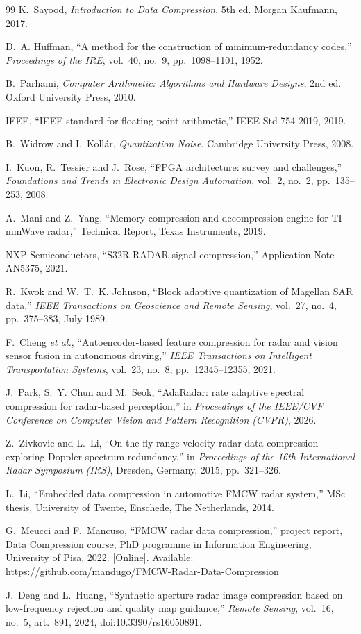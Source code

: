 \begin{thebibliography}{99}
K.~Sayood, \emph{Introduction to Data Compression}, 5th ed. Morgan Kaufmann,
2017.

D.~A. Huffman, ``A method for the construction of minimum-redundancy codes,''
\emph{Proceedings of the IRE}, vol.~40, no.~9, pp.~1098--1101, 1952.

B.~Parhami, \emph{Computer Arithmetic: Algorithms and Hardware Designs}, 2nd
ed. Oxford University Press, 2010.

IEEE, ``IEEE standard for floating-point arithmetic,'' IEEE Std 754-2019, 2019.

B.~Widrow and I.~Koll\'ar, \emph{Quantization Noise}. Cambridge University
Press, 2008.

I.~Kuon, R.~Tessier and J.~Rose, ``FPGA architecture: survey and challenges,''
\emph{Foundations and Trends in Electronic Design Automation}, vol.~2, no.~2,
pp.~135--253, 2008.

A.~Mani and Z.~Yang, ``Memory compression and decompression engine for TI
mmWave radar,'' Technical Report, Texas Instruments, 2019.

NXP Semiconductors, ``S32R RADAR signal compression,'' Application Note AN5375,
2021.

R.~Kwok and W.~T.~K. Johnson, ``Block adaptive quantization of Magellan SAR
data,'' \emph{IEEE Transactions on Geoscience and Remote Sensing}, vol.~27,
no.~4, pp.~375--383, July 1989.

F.~Cheng \emph{et al.}, ``Autoencoder-based feature compression for radar and
vision sensor fusion in autonomous driving,'' \emph{IEEE Transactions on
Intelligent Transportation Systems}, vol.~23, no.~8, pp.~12345--12355, 2021.

J.~Park, S.~Y. Chun and M.~Seok, ``AdaRadar: rate adaptive spectral compression
for radar-based perception,'' in \emph{Proceedings of the IEEE/CVF Conference on
Computer Vision and Pattern Recognition (CVPR)}, 2026.

Z.~Zivkovic and L.~Li, ``On-the-fly range-velocity radar data compression
exploring Doppler spectrum redundancy,'' in \emph{Proceedings of the 16th
International Radar Symposium (IRS)}, Dresden, Germany, 2015, pp.~321--326.

L.~Li, ``Embedded data compression in automotive FMCW radar system,'' MSc
thesis, University of Twente, Enschede, The Netherlands, 2014.

G.~Meucci and F.~Mancuso, ``FMCW radar data compression,'' project report,
Data Compression course, PhD programme in Information Engineering, University
of Pisa, 2022. [Online]. Available:
\url{https://github.com/mandugo/FMCW-Radar-Data-Compression}

J.~Deng and L.~Huang, ``Synthetic aperture radar image compression based on
low-frequency rejection and quality map guidance,'' \emph{Remote Sensing},
vol.~16, no.~5, art.~891, 2024, doi:10.3390/rs16050891.

\end{thebibliography}
